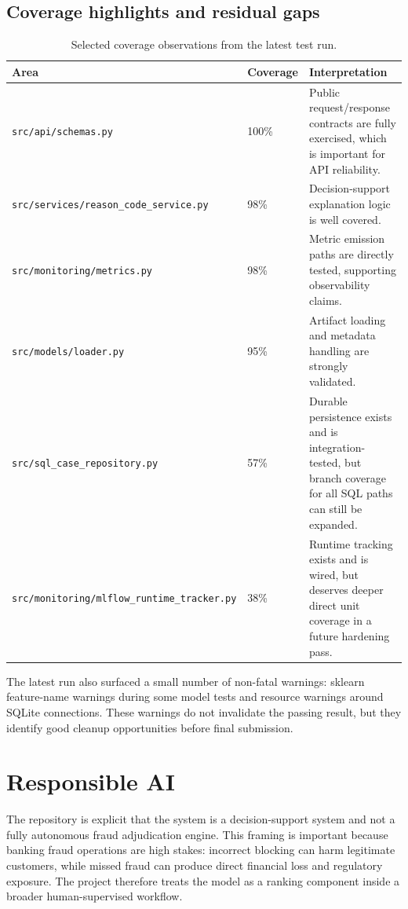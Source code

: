 \documentclass[11pt]{article}
\newcommand{\code}[1]{\texttt{#1}}
\begin{document}
\subsection*{Coverage highlights and residual gaps}
\begin{table}[H]
\small
\centering
\begin{tabularx}{\textwidth}{p{}p{}X}
\toprule
Area & Coverage & Interpretation \\
\midrule
\code{src/api/schemas.py} & 100\% & Public request/response contracts are fully exercised, which is important for API reliability. \\
\code{src/services/reason\_code\_service.py} & 98\% & Decision-support explanation logic is well covered. \\
\code{src/monitoring/metrics.py} & 98\% & Metric emission paths are directly tested, supporting observability claims. \\
\code{src/models/loader.py} & 95\% & Artifact loading and metadata handling are strongly validated. \\
\code{src/sql\_case\_repository.py} & 57\% & Durable persistence exists and is integration-tested, but branch coverage for all SQL paths can still be expanded. \\
\code{src/monitoring/mlflow\_runtime\_tracker.py} & 38\% & Runtime tracking exists and is wired, but deserves deeper direct unit coverage in a future hardening pass. \\
\bottomrule
\end{tabularx}
\caption{Selected coverage observations from the latest test run.}
\end{table}

The latest run also surfaced a small number of non-fatal warnings: sklearn feature-name warnings during some model tests and resource warnings around SQLite connections. These warnings do not invalidate the passing result, but they identify good cleanup opportunities before final submission.

\section{Responsible AI}
The repository is explicit that the system is a decision-support system and not a fully autonomous fraud adjudication engine. This framing is important because banking fraud operations are high stakes: incorrect blocking can harm legitimate customers, while missed fraud can produce direct financial loss and regulatory exposure. The project therefore treats the model as a ranking component inside a broader human-supervised workflow.
\end{document}
